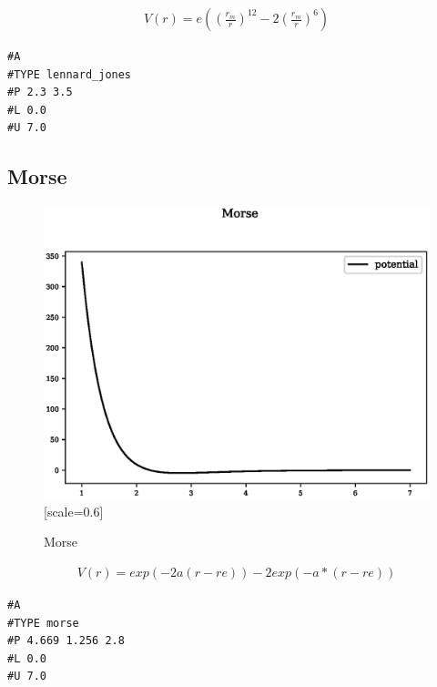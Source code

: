 \documentclass[12pt,twoside]{manual}
\begin{document}
\begin{appendices}
\begin{equation}
\begin{split}
V(r) = e \left(\left(\frac{r_m}{r}\right)^12 - 2 \left(\frac{r_m}{r}\right)^6\right)
\end{split}
\label{eq:eqLennardJones}
\end{equation}

\begin{lstlisting}[style=pseudocode,caption={Lennard-Jones}]
#A
#TYPE lennard_jones
#P 2.3 3.5
#L 0.0
#U 7.0
\end{lstlisting}






\subsection{Morse}

\begin{figure}[h]
  \begin{center}
    \includegraphics{img/plots/morse.eps}[scale=0.6]
    \caption{Morse}
    \label{graph:graph1}
  \end{center}
\end{figure}

\begin{equation}
\begin{split}
V(r) = exp(-2 a (r - re)) - 2 exp (-a*(r - re))
\end{split}
\label{eq:eqMorse}
\end{equation}

\begin{lstlisting}[style=pseudocode,caption={Morse}]
#A
#TYPE morse
#P 4.669 1.256 2.8
#L 0.0
#U 7.0
\end{lstlisting}






\end{appendices}
\end{document}
